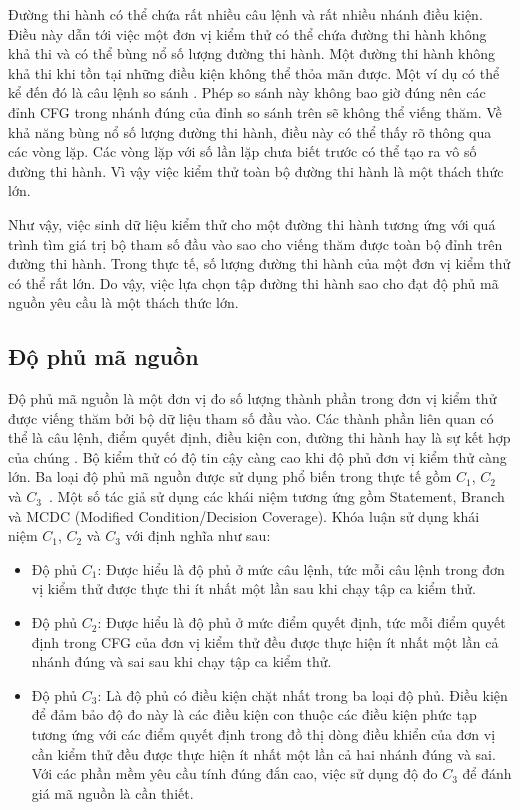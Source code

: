 Đường thi hành có thể chứa rất nhiều câu lệnh và rất nhiều nhánh điều kiện. Điều này dẫn tới việc một đơn vị kiểm thử có thể chứa đường thi hành không khả thi và có thể bùng nổ số lượng đường thi hành. Một đường thi hành không khả thi khi tồn tại những điều kiện không thể thỏa mãn được. Một ví dụ có thể kể đến đó là câu lệnh so sánh . Phép so sánh này không bao giờ đúng nên các đỉnh CFG trong nhánh đúng của đỉnh so sánh trên sẽ không thể viếng thăm. Về khả năng bùng nổ số lượng đường thi hành, điều này có thể thấy rõ thông qua các vòng lặp. Các vòng lặp với số lần lặp chưa biết trước có thể tạo ra vô số đường thi hành. Vì vậy việc kiểm thử toàn bộ đường thi hành là một thách thức lớn.

Như vậy, việc sinh dữ liệu kiểm thử cho một đường thi hành tương ứng với quá trình tìm giá trị bộ tham số đầu vào sao cho viếng thăm được toàn bộ đỉnh trên đường thi hành. Trong thực tế, số lượng đường thi hành của một đơn vị kiểm thử có thể rất lớn. Do vậy, việc lựa chọn tập đường thi hành sao cho đạt độ phủ mã nguồn yêu cầu là một thách thức lớn.

\subsection{Độ phủ mã nguồn} \label{sec:coverage}
Độ phủ mã nguồn là một đơn vị đo số lượng thành phần trong đơn vị kiểm thử được viếng thăm bởi bộ dữ liệu tham số đầu vào. Các thành phần liên quan có thể là câu lệnh, điểm quyết định, điều kiện con, đường thi hành hay là sự kết hợp của chúng \cite{GiaoTrinhKiemThu}. Bộ kiểm thử có độ tin cậy càng cao khi độ phủ đơn vị kiểm thử càng lớn. Ba loại độ phủ mã nguồn được sử dụng phổ biến trong thực tế gồm $C_1$, $C_2$ và $C_3$~\cite{GiaoTrinhKiemThu}. Một số tác giả sử dụng các khái niệm tương ứng gồm Statement, Branch và MCDC (Modified Condition/Decision Coverage). Khóa luận sử dụng khái niệm $C_1$, $C_2$ và $C_3$ với định nghĩa như sau:
\begin{itemize}
	\item Độ phủ $C_1$: Được hiểu là độ phủ ở mức câu lệnh, tức mỗi câu lệnh trong đơn vị kiểm thử được thực thi ít nhất một lần sau khi chạy tập ca kiểm thử.
	
	\item Độ phủ $C_2$: Được hiểu là độ phủ ở mức điểm quyết định, tức mỗi điểm quyết định trong CFG của đơn vị kiểm thử đều được thực hiện ít nhất một lần cả nhánh đúng và sai sau khi chạy tập ca kiểm thử.
	
	\item Độ phủ $C_3$: Là độ phủ có điều kiện chặt nhất trong ba loại độ phủ. Điều kiện để đảm bảo độ đo này là các điều kiện con thuộc các điều kiện phức tạp tương ứng với các điểm quyết định trong đồ thị dòng điều khiển của đơn vị cần kiểm thử đều được thực hiện ít nhất một lần cả hai nhánh đúng và sai. Với các phần mềm yêu cầu tính đúng đắn cao, việc sử dụng độ đo $C_3$ để đánh giá mã nguồn là cần thiết.
\end{itemize}

